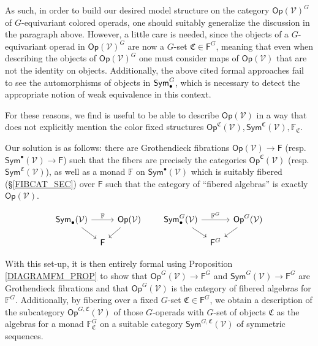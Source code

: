 \documentclass[a4paper,10pt
,draft
]{article}%
\renewcommand{\1}{\eta}%
\begin{document}
As such, in order to build our desired model structure on the category $\mathsf{Op}(\mathcal{V})^G$ of $G$-equivariant colored operads, one should suitably generalize the discussion in the paragraph above.
However, a little care is needed, since the objects of a $G$-equivariant operad in $\mathsf{Op}(\mathcal{V})^G$ are now a $G$-set $\mathfrak{C} \in \mathsf{F}^G$, meaning that even when describing the objects of 
$\mathsf{Op}(\mathcal{V})^G$ one must consider maps of 
$\mathsf{Op}(\mathcal{V})$ that are not the identity on objects.
Additionally, the above cited formal approaches fail to see the automorphisms of objects in $\mathsf{Sym}^G_\bullet$,
which is necessary to detect the appropriate notion of weak equivalence in this context.

For these reasons, we find is useful to be able to describe 
$\mathsf{Op}(\mathcal{V})$ 
in a way that does not explicitly mention the color fixed structures
$\mathsf{Op}^{\mathfrak{C}}(\mathcal{V}),
\mathsf{Sym}^{\mathfrak{C}}(\mathcal{V}),
\mathbb{F}_{\mathfrak{C}}$.

Our solution is as follows: %
there are Grothendieck fibrations 
$\mathsf{Op}(\mathcal{V}) \to \mathsf{F}$
(resp. $\mathsf{Sym}^\bullet(\mathcal{V}) \to \mathsf{F}$)
such that the fibers are precisely the categories 
$\mathsf{Op}^{\mathfrak{C}}(\mathcal{V})$
(resp. $\mathsf{Sym}^{\mathfrak{C}}(\mathcal{V})$),
as well as a monad $\mathbb{F}$ on 
$\mathsf{Sym}^\bullet(\mathcal{V})$ which is suitably fibered (\S \ref{FIBCAT_SEC}) over $\mathsf{F}$
such that the category of ``fibered algebras'' is exactly
$\mathsf{Op}(\mathcal{V})$.

\[
      \begin{tikzcd}[row sep = small, column sep = tiny]
            \Sym_\bullet(\V) \arrow[rr, "\mathbb F"] \arrow[dr]
            &&
            \Op(\V) \arrow[dl]
            &&& %
            \Sym^G_\bullet(\V) \arrow[rr, "\mathbb F^G"] \arrow[dr]
            &&
            \Op^G(\V) \arrow[dl]
            \\
            &
            \Fin
            &
            &&& %
            &
            \Fin^G
      \end{tikzcd}
\]

With this set-up, it is then entirely formal using Proposition \ref{DIAGRAMFM_PROP} to show that 
$\mathsf{Op}^G(\mathcal{V}) \to \mathsf{F}^G$
and
$\mathsf{Sym}^G(\mathcal{V}) \to \mathsf{F}^G$
are Grothendieck fibrations and that 
$\mathsf{Op}^G(\mathcal{V})$ is the category of fibered algebras for $\mathbb{F}^G$.
Additionally, by fibering over a fixed $G$-set $\mathfrak{C} \in \mathsf{F}^G$,
we obtain a description of the subcategory 
$\mathsf{Op}^{G,\mathfrak{C}}(\mathcal{V})$
of those $G$-operads with $G$-set of objects $\mathfrak{C}$
as the algebras for a monad $\mathbb{F}^G_{\mathfrak{C}}$
on a suitable category $\mathsf{Sym}^{G,\mathfrak{C}}(\mathcal{V})$
of symmetric sequences.
\end{document}
